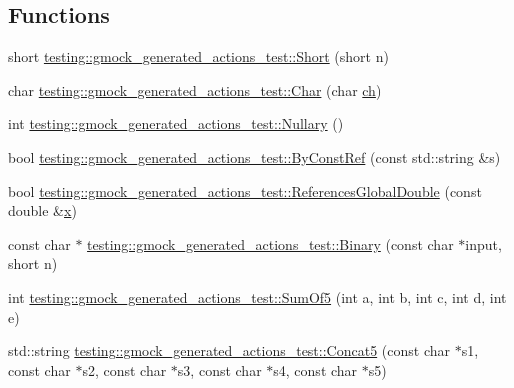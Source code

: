 \subsection*{Functions}
\begin{DoxyCompactItemize}
\item 
short \mbox{\hyperlink{namespacetesting_1_1gmock__generated__actions__test_a7c442b3594b6717b8d499781a82170b2}{testing\+::gmock\+\_\+generated\+\_\+actions\+\_\+test\+::\+Short}} (short n)
\item 
char \mbox{\hyperlink{namespacetesting_1_1gmock__generated__actions__test_aa07e216a4c9d492fb7e7c8fde949bc8f}{testing\+::gmock\+\_\+generated\+\_\+actions\+\_\+test\+::\+Char}} (char \mbox{\hyperlink{_obj__test_2lib_2googletest-master_2googlemock_2test_2gmock-matchers__test_8cc_af53f92900705f7de3c139a05b2f9ef16}{ch}})
\item 
int \mbox{\hyperlink{namespacetesting_1_1gmock__generated__actions__test_acb3d926ebbe88529c38d95f5e61573ef}{testing\+::gmock\+\_\+generated\+\_\+actions\+\_\+test\+::\+Nullary}} ()
\item 
bool \mbox{\hyperlink{namespacetesting_1_1gmock__generated__actions__test_aecf48d9fccd335e231a51013e61b8129}{testing\+::gmock\+\_\+generated\+\_\+actions\+\_\+test\+::\+By\+Const\+Ref}} (const std\+::string \&s)
\item 
bool \mbox{\hyperlink{namespacetesting_1_1gmock__generated__actions__test_a3e552b41de08f0516f4b0e32fed68a61}{testing\+::gmock\+\_\+generated\+\_\+actions\+\_\+test\+::\+References\+Global\+Double}} (const double \&\mbox{\hyperlink{_obj__test_2lib_2googletest-master_2googlemock_2test_2gmock-matchers__test_8cc_a6150e0515f7202e2fb518f7206ed97dc}{x}})
\item 
const char $\ast$ \mbox{\hyperlink{namespacetesting_1_1gmock__generated__actions__test_ac5e6c89b4c4832bd3db18173c40c55ad}{testing\+::gmock\+\_\+generated\+\_\+actions\+\_\+test\+::\+Binary}} (const char $\ast$input, short n)
\item 
int \mbox{\hyperlink{namespacetesting_1_1gmock__generated__actions__test_a7ebfbfdf11d92d4f99df6b659c371e74}{testing\+::gmock\+\_\+generated\+\_\+actions\+\_\+test\+::\+Sum\+Of5}} (int a, int b, int c, int d, int e)
\item 
std\+::string \mbox{\hyperlink{namespacetesting_1_1gmock__generated__actions__test_a5eb28d383a654ddc97e16496753c9e45}{testing\+::gmock\+\_\+generated\+\_\+actions\+\_\+test\+::\+Concat5}} (const char $\ast$s1, const char $\ast$s2, const char $\ast$s3, const char $\ast$s4, const char $\ast$s5)

\end{DoxyCompactItemize}
